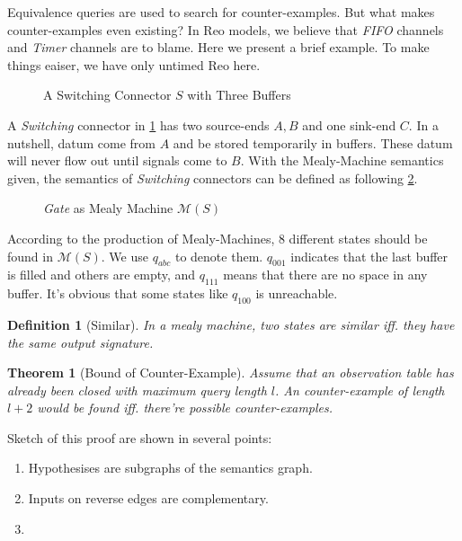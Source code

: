 \documentclass[conference, a4paper]{IEEEtran}
\newtheorem{theorem}{Theorem}
\newtheorem{definition}{Definition}
\begin{document}
Equivalence queries are used to search for counter-examples. But what makes counter-examples even
existing? In Reo models, we believe that \emph{FIFO} channels and \emph{Timer} channels are to
blame. Here we present a brief example. To make things eaiser, we have only untimed Reo here.

\begin{figure}[h]
  \begin{center}
    
  \end{center}
  \caption{A Switching Connector $S$ with Three Buffers}
  \label{fig:buf3}
\end{figure}

A \emph{Switching} connector in \figurename \ref{fig:buf3} has two source-ends $A,B$ and one
sink-end $C$. In a nutshell, datum come from $A$ and be stored temporarily in buffers. These datum
will never flow out until signals come to $B$. With the Mealy-Machine semantics given, the semantics
of \emph{Switching} connectors can be defined as following \figurename \ref{fig:buf3semantics}.

\begin{figure}[h]
  \begin{center}
    
  \end{center}
  \caption{\emph{Gate} as Mealy Machine $\mathcal{M}(S)$}
  \label{fig:buf3semantics}
\end{figure}

According to the production of Mealy-Machines, 8 different states should be found in
$\mathcal{M}(S)$. We use $q_{abc}$ to denote them. $q_{001}$ indicates that the last buffer is
filled and others are empty, and $q_{111}$ means that there are no space in any buffer. It's
obvious that some states like $q_{100}$ is unreachable.

\begin{definition}[Similar]
  In a mealy machine, two states are similar iff. they have the same output signature.
\end{definition}

\begin{theorem}[Bound of Counter-Example]
  \label{the:cebound} Assume that an observation table has already been closed with maximum
  query length  $l$. An counter-example of length $l+2$ would be
  found iff. there're possible counter-examples.
\end{theorem}
\begin{IEEEproof}
  Sketch of this proof are shown in several points:
  \begin{enumerate}
    \item Hypothesises are subgraphs of the semantics graph.
    \item Inputs on reverse edges are complementary.
    \item 
  \end{enumerate}
\end{IEEEproof}
\end{document}
